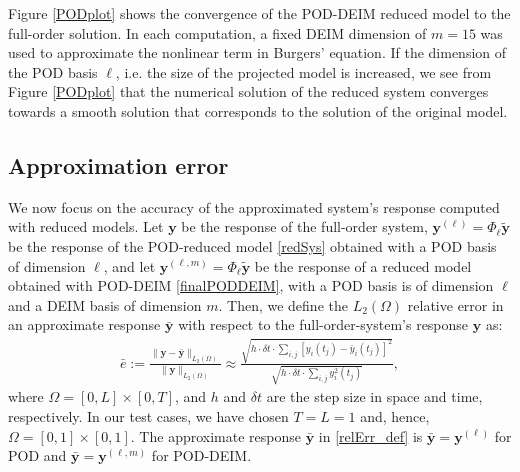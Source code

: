 Figure \ref{PODplot} shows the convergence of the POD-DEIM reduced model to the full-order solution. In each computation, a fixed DEIM dimension of $m = 15$ was used to approximate the nonlinear term in Burgers' equation. If the dimension of the POD basis $\ell$, i.e. the size of the projected model is increased, we see from Figure \ref{PODplot} that the numerical solution of the reduced system converges towards a smooth solution that corresponds to the solution of the original model.
\subsection{Approximation error}
We now focus on the accuracy of the approximated system's response computed with reduced models. Let $\mathbf{y}$ be the response of the full-order system, $\mathbf{y}^{(\ell)} = \Phi_\ell \mathbf{\tilde y}$ be the response of the POD-reduced model \eqref{redSys} obtained with a POD basis of dimension $\ell$, and let $\mathbf{y}^{(\ell,m)} = \Phi_\ell \mathbf{\tilde y}$ be the response of a reduced model obtained with POD-DEIM \eqref{finalPODDEIM}, with a POD basis is of dimension $\ell$ and a DEIM basis of dimension $m$. Then, we define the $L_2(\Omega)$ relative error in an approximate response $\mathbf{\bar{y}}$ with respect to the full-order-system's response $\mathbf{y}$ as:
\begin{align}
\label{relErr_def}
\bar{e} := \frac{\|\mathbf{y} - \mathbf{\bar{y}}\|_{L_2(\Omega)}}{\|\mathbf{y}\|_{L_2(\Omega)}} \approx \frac{\sqrt{h \cdot \delta \! t \cdot \sum_{i,j} [y_i(t_j) - \bar{y}_i(t_j)]^2}}{\sqrt{h \cdot \delta \! t \cdot \sum_{i,j} y_i^2(t_j)}},
\end{align}
where $\Omega = [0,L] \times [0,T]$, and $h$ and $\delta \! t$ are the step size in space and time, respectively. In our test cases, we have chosen $T = L = 1$ and, hence, $\Omega = [0,1] \times [0,1]$. The approximate response $\mathbf{\bar{y}}$ in \eqref{relErr_def} is  $\mathbf{\bar{y}} = \mathbf{y}^{(\ell)}$ for POD and $\mathbf{\bar{y}} = \mathbf{y}^{(\ell,m)}$ for POD-DEIM.

